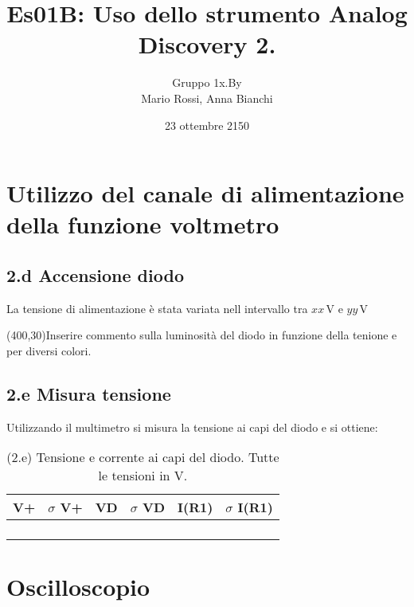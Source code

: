 \documentclass[10pt,a4paper]{article}
\author{Gruppo 1x.By \\ Mario Rossi, Anna Bianchi \rem{non dimenticate i nomi}}
\title{Es01B: Uso dello strumento Analog Discovery 2.}
\newcommand{\exn}{\phantom{xxx}}
\begin{document}
\date{23 ottembre 2150}
\maketitle

\setcounter{section}{1}

\section{Utilizzo del canale di alimentazione della funzione voltmetro}

\subsection*{2.d Accensione diodo}

La tensione di alimentazione \`e stata variata nell intervallo tra $xx\,\mathrm{V}$ e $yy\,\mathrm{V}$


\vspace{0.5cm}
\framebox(400,30){Inserire commento sulla luminosit\`a del diodo in funzione della tenione e per diversi colori.}

\subsection*{2.e Misura tensione}
Utilizzando il multimetro si misura la tensione ai capi del diodo e si ottiene:

\begin{table}[h]
\centering
\begin{tabular}{|c|c|c|c|c|c|}
\hline 
V+& $\sigma$ V+  & VD & $\sigma$ VD & I(R1)  & $\sigma$ I(R1) \\
\hline 
\exn & \exn & \exn & \exn & \exn &\exn \\
\exn & \exn & \exn & \exn & \exn &\exn \\
\exn & \exn & \exn & \exn & \exn &\exn \\
\exn & \exn & \exn & \exn & \exn &\exn \\
\hline 
\end{tabular} 
\caption{(2.e) Tensione e corrente ai capi del diodo. Tutte le tensioni in V.\label{t:par1}}
\end{table}


\section{Oscilloscopio}
\end{document}
